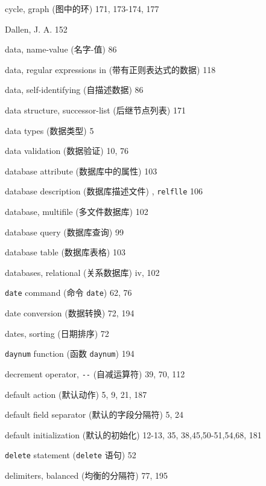 \begin{multicols}{3}
\hangindent=3pc  cycle, graph (图中的环) 171, 173-174, 177

\hangindent=3pc  Dallen, J. A. 152

\hangindent=3pc  data, name-value (\mbox{名字}-值) 86

\hangindent=3pc  data, regular expressions in
(带有正则表达式的数据) 118

\hangindent=3pc  data, self-identifying (自描述数据) 86

\hangindent=3pc  data structure, successor-list (后继节点列表) 171

\hangindent=3pc  data types (数据类型) 5

\hangindent=3pc  data validation (数据验证) 10, 76

\hangindent=3pc  database attribute (数据库中的属性) 103

\hangindent=3pc  database description (数据库描述文件) ,
\verb'relflle' 106

\hangindent=3pc  database, multifile (多文件数据库) 102

\hangindent=3pc  database query (数据库查询) 99

\hangindent=3pc  database table (数据库表格) 103

\hangindent=3pc  databases, relational (关系数据库) iv, 102


\hangindent=3pc  \verb'date' command (命令 \verb'date') 62, 76

\hangindent=3pc  date conversion (数据转换) 72, 194

\hangindent=3pc  dates, sorting (日期排序) 72

\hangindent=3pc  \verb'daynum' function (函数 \verb'daynum') 194

\hangindent=3pc  decrement operator, \verb'--' (自减运算符) 39, 70, 112

\hangindent=3pc  default action (默认动作) 5, 9, 21, 187

\hangindent=3pc  default field separator (默认的字段分隔符) 5, 24

\hangindent=3pc  default initialization (默认的初始化) 12-13, 35, 38,45,50-51,54,68, 181

\hangindent=3pc  \verb'delete' statement (\verb'delete' 语句) 52

\hangindent=3pc  delimiters, balanced (均衡的分隔符) 77, 195


\end{multicols}
